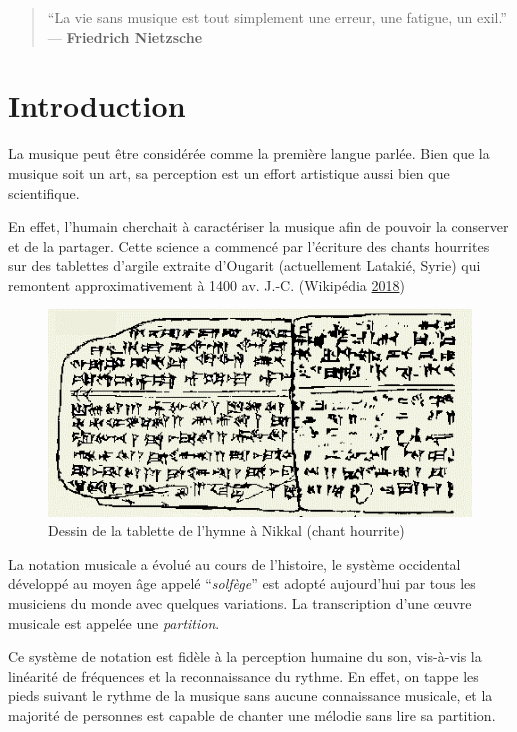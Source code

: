 \documentclass[french,]{article}
\begin{document}
{
\setcounter{tocdepth}{2}
\tableofcontents
}
\pagebreak

\begin{quote}
``La vie sans musique est tout simplement une erreur, une fatigue, un
exil.'' --- \textbf{Friedrich Nietzsche}
\end{quote}

\hypertarget{introduction}{%
\section{Introduction}\label{introduction}}

La musique peut être considérée comme la première langue parlée. Bien
que la musique soit un art, sa perception est un effort artistique aussi
bien que scientifique.

En effet, l'humain cherchait à caractériser la musique afin de pouvoir
la conserver et de la partager. Cette science a commencé par l'écriture
des chants hourrites sur des tablettes d'argile extraite d'Ougarit
(actuellement Latakié, Syrie) qui remontent approximativement à 1400 av.
J.-C. (Wikipédia \protect\hyperlink{ref-ougarit}{2018})

\begin{figure}
\centering
\includegraphics{img/Hurritische_hymne.png}
\caption{Dessin de la tablette de l'hymne à Nikkal (chant hourrite)}
\end{figure}

La notation musicale a évolué au cours de l'histoire, le système
occidental développé au moyen âge appelé ``\emph{solfège}'' est adopté
aujourd'hui par tous les musiciens du monde avec quelques variations. La
transcription d'une œuvre musicale est appelée une \emph{partition}.

Ce système de notation est fidèle à la perception humaine du son,
vis-à-vis la linéarité de fréquences et la reconnaissance du rythme. En
effet, on tappe les pieds suivant le rythme de la musique sans aucune
connaissance musicale, et la majorité de personnes est capable de
chanter une mélodie sans lire sa partition.
\end{document}
